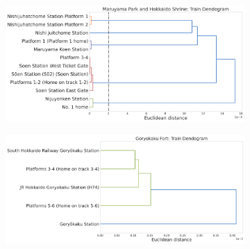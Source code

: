 \documentclass[11pt]{article}
\begin{document}
\begin{figure}[H]
  \centering
  \begin{subfigure}[t]{0.45\textwidth}
    \centering
    \includegraphics[width=\textwidth]{images/Maruyama Park and Hokkaido Shrine__threshold.png}
  \end{subfigure}
  \hfill
  \begin{subfigure}[t]{0.49\textwidth}
    \centering
    \includegraphics[width=\textwidth]{images/Goryokaku Fort__threshold.png}
  \end{subfigure}


\end{figure}
\end{document}
